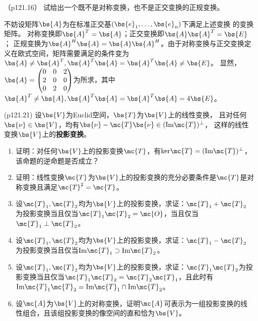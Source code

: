 \documentclass[12pt, a4paper, oneside, UTF8]{ctexbook}
\begin{document}
\begin{question}（p121.16）
    试给出一个既不是对称变换，也不是正交变换的正规变换。
\end{question}

\begin{solution}
    不妨设矩阵$\bs{A}$为在标准正交基$(\bs{e}_1,\ldots,\bs{e}_n)$下满足上述变换
    的变换矩阵。
    对称变换即$\bs{A}^T=\bs{A}$；正交变换即$\bs{A}\bs{A}^T=\bs{E}$；
    正规变换为$\bs{A}^H\bs{A}=\bs{A}\bs{A}^H$。由于对称变换与正交变换定义在欧式空间，矩阵需要满足的条件变为
    $\bs{A}\neq \bs{A}^T,\bs{A}^T\bs{A}=\bs{A}^T\bs{A} \neq \bs{E}$。
    显然，$\bs{A}=\begin{pmatrix}
        0 & 0 & 2 \\
        2 & 0 & 0 \\
        0 & 2 & 0
    \end{pmatrix}$为所求，其中$\bs{A}^T\neq \bs{A},\bs{A}^T\bs{A}=\bs{A}^T\bs{A}=4\bs{E}$。

\end{solution}


\begin{question}(p121.21)
设$\bs{V}$为Euclid空间，$\bs{T}$为$\bs{V}$上的线性变换，
且对任何$\bs{\nu}\in \bs{V}$，均有$\bs{\nu}-\mc{T}\bs{\nu} \in (\mathrm{Im}\mc{T})^{\perp}$，
这样的线性变换$\bs{V}$上的\textbf{投影变换}。
\begin{enumerate}[label=(\arabic*)]
    \item 证明：对任何$\bs{V}$上的投影变换$\mc{T}$，有$\mathrm{ker}\mc{T}=(\mathrm{Im}\mc{T})^{\perp}$，该命题的逆命题是否成立？
    \item 证明：线性变换$\mc{T}$为$\bs{V}$上的投影变换的充分必要条件是$\mc{T}$是对称变换且满足$\mc{T}^2=\mc{T}$。
    \item 设$\mc{T}_1,\mc{T}_2$均为$\bs{V}$上的投影变换，求证：$\mc{T}_1+\mc{T}_2$为投影变换当且仅当$\mc{T}_1\mc{T}_2=\mc{O}$，当且仅当$\mc{T}_1 \perp \mc{T}_2$。
    \item 设$\mc{T}_1,\mc{T}_2$均为$\bs{V}$上的投影变换，求证：$\mc{T}_1-\mc{T}_2$为投影变换当且仅当$\mathrm{Im}\mc{T}_1 \supset \mathrm{Im}\mc{T}_2$。
    \item 设$\mc{T}_1,\mc{T}_2$均为$\bs{V}$上的投影变换，求证：$\mc{T}_1\mc{T}_2$为投影变换当且仅当$\mc{T}_1\mc{T}_2=\mc{T}_2\mc{T}_1$，且此时有$\mathrm{Im}\mc{T}_1\mc{T}_2=\mathrm{Im}\mc{T}_1 \cap \mathrm{Im} \mc{T}_2$。
    \item 设$\mc{A}$为$\bs{V}$上的对称变换，证明$\mc{A}$可表示为一组投影变换的线性组合，且该组投影变换的像空间的直和恰为$\bs{V}$。
\end{enumerate}
\end{question}
\end{document}
